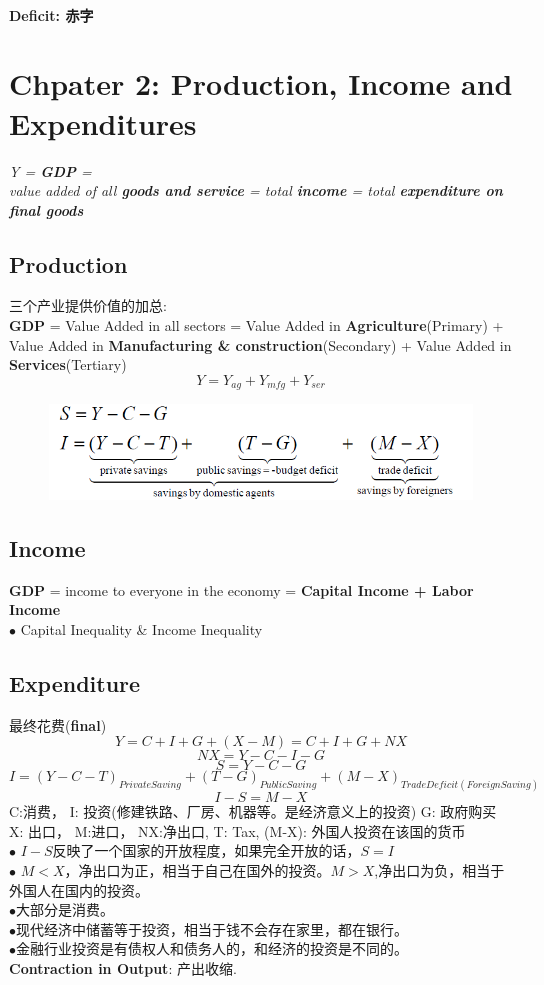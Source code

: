 \documentclass[UTF8, onecolumn, a4paper, 12pt]{article}
\begin{document}
\paragraph{Deficit: 赤字}
\section{Chpater 2: Production, Income and Expenditures}
\textit{Y = \textbf{GDP} = \\ value added of all \textbf{goods and service} = total \textbf{income} = total \textbf{expenditure on final goods}}
\subsection{Production}
三个产业提供价值的加总:\\
\textbf{GDP} = Value Added in all sectors = Value Added in \textbf{Agriculture}(Primary) + Value Added in \textbf{Manufacturing \& construction}(Secondary) + Value Added in \textbf{Services}(Tertiary)
$$Y = Y_{ag} + Y_{mfg} + Y_{ser}$$
\begin{figure}[htb]
	\centering
	\includegraphics[width=0.9\linewidth]{GDP}
\end{figure}
\subsection{Income}
\textbf{GDP} = income to everyone in the economy = \textbf{Capital Income + Labor Income}\\
$\bullet$ Capital Inequality \& Income Inequality
\subsection{Expenditure}最终花费(\textbf{final})
$$Y = C + I+G+(X-M) = C + I + G + NX$$
$$NX = Y - C - I - G$$
$$S = Y - C - G$$
$$I = (Y - C - T)_{PrivateSaving} + (T -G)_{PublicSaving} + (M - X)_{TradeDeficit(ForeignSaving)}$$
$$I - S = M - X$$
C:消费， I: 投资(修建铁路、厂房、机器等。是经济意义上的投资) G: 政府购买
X: 出口， M:进口， NX:净出口, T: Tax, (M-X): 外国人投资在该国的货币\\
$\bullet$ $I-S$反映了一个国家的开放程度，如果完全开放的话，$S = I$\\
$\bullet$ $M < X$，净出口为正，相当于自己在国外的投资。$M > X$,净出口为负，相当于外国人在国内的投资。\\
$\bullet$大部分是消费。\\
$\bullet$现代经济中储蓄等于投资，相当于钱不会存在家里，都在银行。\\
$\bullet$金融行业投资是有债权人和债务人的，和经济的投资是不同的。\\
\textbf{Contraction in Output}: 产出收缩.
\end{document}
